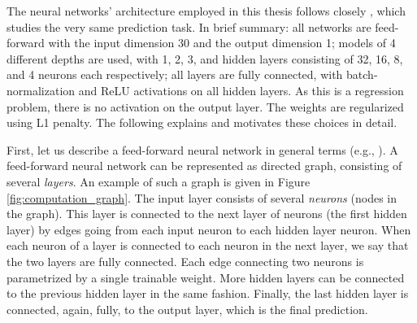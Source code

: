 	 	The neural networks' architecture employed in this thesis follows closely \cite{gu2020empirical}, which studies the very same prediction task. In brief summary: all networks are feed-forward with the input dimension 30 and the output dimension 1; models of 4 different depths are used, with 1, 2, 3, and hidden layers consisting of 32, 16, 8, and 4 neurons each respectively; all layers are fully connected, with batch-normalization \citep{ioffe2015batch} and ReLU activations on all hidden layers. As this is a regression problem, there is no activation on the output layer. The weights are regularized using L1 penalty. The following explains and motivates these choices in detail.
		
		First, let us describe a feed-forward neural network in general terms (e.g., \cite{goodfellow2016deep}). A feed-forward neural network can be represented as directed graph, consisting of several \textit{layers}. An example of such a graph is given in Figure \ref{fig:computation_graph}. The input layer consists of several \textit{neurons} (nodes in the graph). This layer is connected to the next layer of neurons (the first hidden layer) by edges going from each input neuron to each hidden layer neuron. When each neuron of a layer is connected to each neuron in the next layer, we say that the two layers are fully connected. Each edge connecting two neurons is parametrized by a single trainable weight. More hidden layers can be connected to the previous hidden layer in the same fashion. Finally, the last hidden layer is connected, again, fully, to the output layer, which is the final prediction.
		

